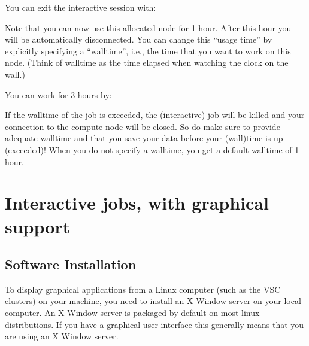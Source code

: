 
You can exit the interactive session with:

\begin{prompt}
\end{prompt}

Note that you can now use this allocated node for 1 hour.  After this hour you
will be automatically disconnected. You can change this ``usage time'' by
explicitly specifying a ``walltime'', i.e., the time that you want to work on
this node.  (Think of walltime as the time elapsed when watching the clock on
the wall.)

You can work for 3 hours by:

\begin{prompt}
\end{prompt}

If the walltime of the job is exceeded, the (interactive) job will be killed
and your connection to the compute node will be closed. So do make sure to
provide adequate walltime and that you save your data before your (wall)time is
up (exceeded)!  When you do not specify a walltime, you get a default walltime
of 1 hour.

\section{Interactive jobs, with graphical support}

\subsection{Software Installation}

To display graphical applications from a Linux computer (such as the VSC
clusters) on your machine, you need to install an X Window server on your
local computer.
\iflinux
An X Window server is packaged by default on most linux distributions. If you
have a graphical user interface this generally means that you are using an
X Window server.
\fi

